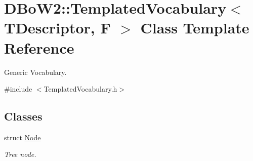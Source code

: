 \hypertarget{class_d_bo_w2_1_1_templated_vocabulary}{}\section{D\+Bo\+W2\+:\+:Templated\+Vocabulary$<$ T\+Descriptor, F $>$ Class Template Reference}
\label{class_d_bo_w2_1_1_templated_vocabulary}


Generic Vocabulary.  




{\ttfamily \#include $<$Templated\+Vocabulary.\+h$>$}

\subsection*{Classes}
\begin{DoxyCompactItemize}
\item 
struct \mbox{\hyperlink{struct_d_bo_w2_1_1_templated_vocabulary_1_1_node}{Node}}
\begin{DoxyCompactList}\small\item\em Tree node. \end{DoxyCompactList}\end{DoxyCompactItemize}

